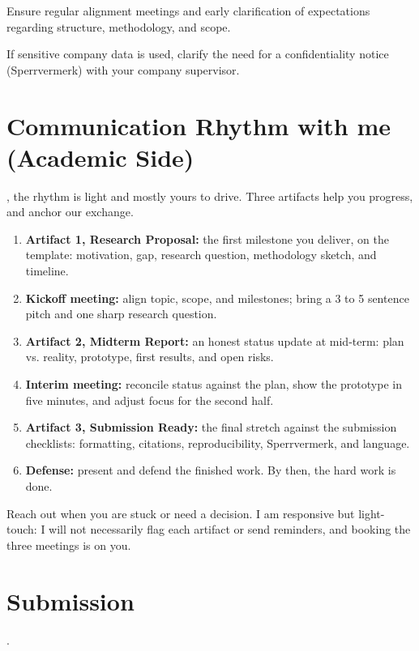 \documentclass{../sharedAssets/tufte}
\begin{document}
Ensure regular alignment meetings and early clarification of expectations regarding
structure, methodology, and scope.

If sensitive company data is used, clarify the need for a confidentiality notice
(Sperrvermerk) with your company supervisor.


\section{Communication Rhythm with me (Academic Side)}
, the rhythm is light and mostly yours
to drive.
Three artifacts help you progress, and anchor our exchange.

\begin{enumerate}
    \item \textbf{Artifact 1, Research Proposal:} the first milestone you deliver, on the
    template: motivation, gap, research question, methodology sketch, and timeline.
    \item \textbf{Kickoff meeting:} align topic, scope, and milestones; bring a 3 to 5
    sentence pitch and one sharp research question.
    \item \textbf{Artifact 2, Midterm Report:} an honest status update at mid-term: plan
    vs. reality, prototype, first results, and open risks.
    \item \textbf{Interim meeting:} reconcile status against the plan, show the prototype
    in five minutes, and adjust focus for the second half.
    \item \textbf{Artifact 3, Submission Ready:} the final stretch against the submission
    checklists: formatting, citations, reproducibility, Sperrvermerk, and language.
    \item \textbf{Defense:} present and defend the finished work.
    By then, the hard work is done.
\end{enumerate}

Reach out when you are stuck or need a decision.
I am responsive but light-touch: I will not necessarily flag each artifact or send
reminders, and booking the three meetings is on you.

\section{Submission}
. 
\end{document}
